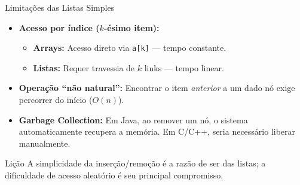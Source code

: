 \documentclass[aspectratio=169]{beamer}
\begin{document}
\begin{frame}{Limitações das Listas Simples}
    \begin{itemize}
        \item \textbf{Acesso por índice ($k$-ésimo item):}
        \begin{itemize}
            \item \textbf{Arrays:} Acesso direto via \texttt{a[k]} --- tempo constante.
            \item \textbf{Listas:} Requer travessia de $k$ links --- tempo linear.
        \end{itemize}

        \item \textbf{Operação ``não natural'':} Encontrar o item \textit{anterior} a um dado nó exige percorrer do início ($O(n)$).

        \item \textbf{Garbage Collection:} Em Java, ao remover um nó, o sistema automaticamente recupera a memória. Em C/C++, seria necessário liberar manualmente.
    \end{itemize}

    \vspace{0.3cm}
    \begin{exampleblock}{Lição}
        A simplicidade da inserção/remoção é a razão de ser das listas; a dificuldade de acesso aleatório é seu principal compromisso.
    \end{exampleblock}
\end{frame}
\end{document}
